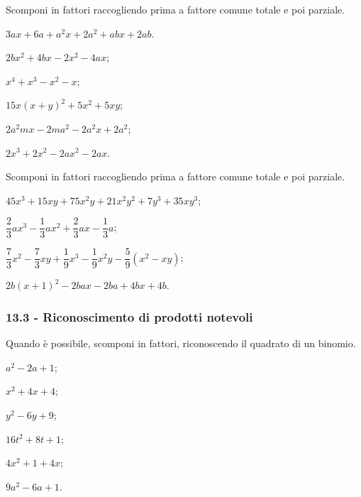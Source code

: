 \begin{esercizio}
\label{ese:13.21}
Scomponi in fattori raccogliendo prima a fattore comune totale e poi parziale.
\begin{multicols}{2}
\begin{enumeratea}
 \item $3ax+6a+a^{2}x+2a^{2}+abx+2ab$.
 \item $2bx^{2}+4bx-2x^{2}-4ax$;
 \item $x^{4}+x^{3}-x^{2}-x$;
 \item $15x(x+y)^{2}+5x^{2}+5xy$;
 \item $2a^{2}mx-2ma^{2}-2a^{2}x+2a^{2}$;
 \item $2x^{3}+2x^{2}-2ax^{2}-2ax$.
\end{enumeratea}
\end{multicols}
\end{esercizio}

\begin{esercizio}[\Ast]
\label{ese:13.22}
Scomponi in fattori raccogliendo prima a fattore comune totale e poi parziale.
\begin{enumeratea}
 \item $45x^{3}+15xy+75x^{2}y+21x^{2}y^{2}+7y^{3}+35xy^{3}$;
 \item $\dfrac{2}{3}ax^{3}-\dfrac{1}{3}ax^{2}+\dfrac{2}{3}ax-\dfrac{1}{3}a$;
 \item $\dfrac{7}{3}x^{2}-\dfrac{7}{3}xy+\dfrac{1}{9}x^{3}-\dfrac{1}{9}x^{2}y-\dfrac{5}{9}(x^{2}-xy)$;
 \item $2b(x+1)^{2}-2bax-2ba+4bx+4b$.
\end{enumeratea}
\end{esercizio}

\subsubsection*{13.3 - Riconoscimento di prodotti notevoli}
\begin{esercizio}
\label{ese:13.23}
Quando è possibile, scomponi in fattori, riconoscendo il quadrato di un binomio.
\begin{multicols}{3}
\begin{enumeratea}
 \item $a^{2}-2a+1$;
 \item $x^{2}+4x+4$;
 \item $y^{2}-6y+9$;
 \item $16t^{2}+8t+1$;
 \item $4x^{2}+1+4x$;
 \item $9a^{2}-6a+1$.
\end{enumeratea}
\end{multicols}
\end{esercizio}

